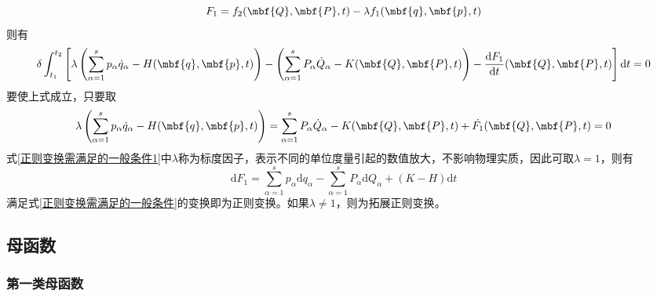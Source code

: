 \begin{equation}
	F_1 = f_2(\mbf{Q},\mbf{P},t) - \lambda f_1(\mbf{q},\mbf{p},t)
\end{equation}
则有
\begin{equation*}
	\delta \int_{t_1}^{t_2} \left[\lambda \left(\sum_{\alpha=1}^s p_\alpha \dot{q}_\alpha - H(\mbf{q},\mbf{p},t)\right) - \left(\sum_{\alpha=1}^s P_\alpha \dot{Q}_\alpha - K(\mbf{Q},\mbf{P},t)\right) - \frac{\mathrm{d} F_1}{\mathrm{d} t}(\mbf{Q},\mbf{P},t)\right] \mathrm{d} t = 0
\end{equation*}
要使上式成立，只要取
\begin{equation}
	\lambda \left(\sum_{\alpha=1}^s p_\alpha \dot{q}_\alpha - H(\mbf{q},\mbf{p},t)\right) = \sum_{\alpha=1}^s P_\alpha \dot{Q}_\alpha - K(\mbf{Q},\mbf{P},t) + \dot{F_1}(\mbf{Q},\mbf{P},t) = 0
	\label{正则变换需满足的一般条件1}
\end{equation}
式\eqref{正则变换需满足的一般条件1}中$\lambda$称为{\heiti 标度因子}，表示不同的单位度量引起的数值放大，不影响物理实质，因此可取$\lambda=1$，则有
\begin{equation}
	\mathrm{d} F_1 = \sum_{\alpha=1}^s p_\alpha \mathrm{d} q_\alpha - \sum_{\alpha=1}^s P_\alpha \mathrm{d} Q_\alpha + (K-H) \mathrm{d} t
	\label{正则变换需满足的一般条件}
\end{equation}
满足式\eqref{正则变换需满足的一般条件}的变换即为{\heiti 正则变换}。如果$\lambda \neq 1$，则为{\heiti 拓展正则变换}。

\subsection{母函数}

\subsubsection{第一类母函数}

